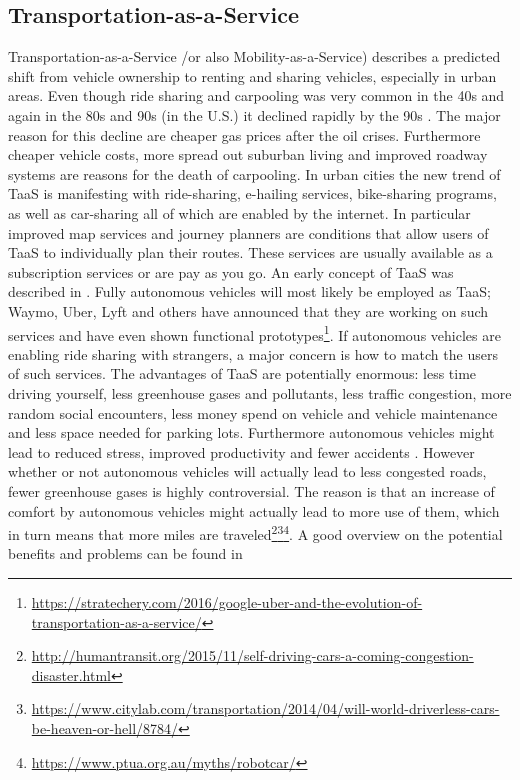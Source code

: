 \subsection{Transportation-as-a-Service}\label{ssec:TaaS}
Transportation-as-a-Service /or also Mobility-as-a-Service) describes a predicted shift from vehicle ownership to renting and sharing vehicles, especially in urban areas. Even though ride sharing and carpooling was very common in the 40s and again in the 80s and 90s (in the U.S.) it declined rapidly by the 90s \cite{Ferguson}. The major reason for this decline are cheaper gas prices after the oil crises. Furthermore cheaper vehicle costs, more spread out suburban living and improved roadway systems are reasons for the death of carpooling. In urban cities the new trend of TaaS is manifesting with  ride-sharing, e-hailing services, bike-sharing programs, as well as car-sharing all of which are enabled by the internet. In particular improved map services and journey planners are conditions that allow users of TaaS to individually plan their routes. These services are usually available as a subscription services or are pay as you go. An early concept of TaaS was described in \cite{Tschanz1996TheServices}. Fully autonomous vehicles will most likely be employed as TaaS; Waymo, Uber, Lyft and others have announced that they are working on such services and have even shown functional prototypes\footnote{\url{https://stratechery.com/2016/google-uber-and-the-evolution-of-transportation-as-a-service/}}. If autonomous vehicles are enabling ride sharing with strangers, a major concern is how to match the users of such services. The advantages of TaaS are potentially enormous: less time driving yourself, less greenhouse gases and pollutants, less traffic congestion, more random social encounters, less money spend on vehicle and vehicle maintenance and less space needed for parking lots. Furthermore autonomous vehicles might lead to reduced stress, improved productivity and fewer accidents \cite{Fagnant2015PreparingRecommendations}. However whether or not autonomous vehicles will actually lead to less congested roads, fewer greenhouse gases is highly controversial. The reason is that an increase of comfort by autonomous vehicles might actually lead to more use of them, which in turn means that more miles are traveled\footnote{\url{http://humantransit.org/2015/11/self-driving-cars-a-coming-congestion-disaster.html}}\fnsep\footnote{\url{https://www.citylab.com/transportation/2014/04/will-world-driverless-cars-be-heaven-or-hell/8784/}}\fnsep\footnote{\url{https://www.ptua.org.au/myths/robotcar/}}. A good overview on the potential benefits and problems can be found in \cite{Litman2014AutonomousPlanning} 


